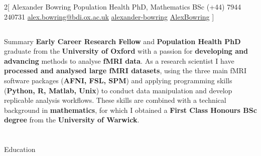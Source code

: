\documentclass{my_cv}
\begin{document}
\begin{multicols}{2}[
    \titletext{}%
    		{Alexander Bowring}
        {Population Health PhD, Mathematics BSc}%
        {(+44) 7944 240731}%
        {\href{mailto:alex.bowring@bdi.ox.ac.uk}{alex.bowring@bdi.ox.ac.uk}}%
        {\href{https://www.linkedin.com/in/alexander-bowring/}{alexander-bowring}}%
        {\href{https://github.com/AlexBowring/}{AlexBowring}}
]

\end{multicols}

\vspace{-1.7cm}
\begin{tcolorbox}[colback=white,colframe=black,width=\dimexpr\textwidth+12mm\relax,enlarge left by=-6mm]
\section{\faStickyNote}{Summary}
\textbf{Early Career Research Fellow} and \textbf{Population Health PhD} graduate from the \textbf{University of Oxford} with a passion for \textbf{developing and advancing} methods to analyse \textbf{fMRI data}. As a research scientist I have \textbf{processed and analysed large fMRI datasets}, using the three main fMRI software packages (\textbf{AFNI, FSL, SPM}) and applying programming skills (\textbf{Python, R, Matlab, Unix}) to conduct data manipulation and develop replicable analysis workflows. These skills are combined with a technical background in \textbf{mathematics}, for which I obtained a \textbf{First Class Honours BSc degree} from the \textbf{University of Warwick}. 
  
\end{tcolorbox}


\section{\faGraduationCap}{Education}
\end{document}
